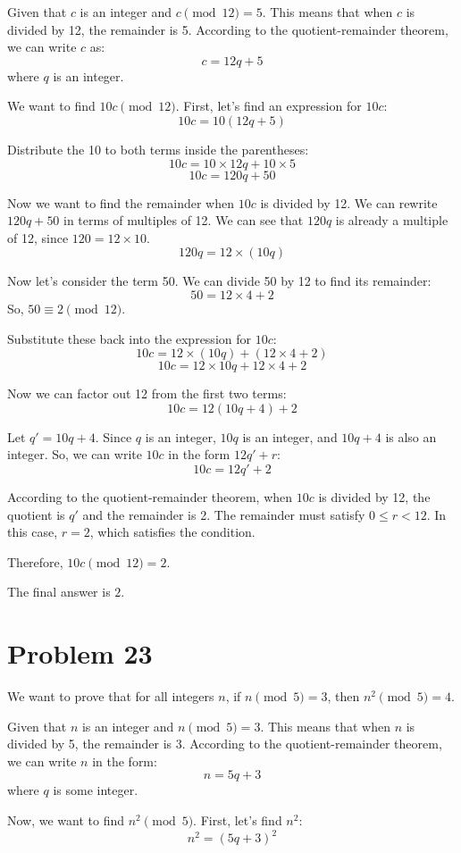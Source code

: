 \documentclass{article}
\begin{document}
Given that $c$ is an integer and $c \pmod{12} = 5$.
This means that when $c$ is divided by 12, the remainder is 5.
According to the quotient-remainder theorem, we can write $c$ as:
$$ c = 12q + 5 $$
where $q$ is an integer.

We want to find $10c \pmod{12}$.
First, let's find an expression for $10c$:
$$ 10c = 10(12q + 5) $$

Distribute the 10 to both terms inside the parentheses:
$$ 10c = 10 \times 12q + 10 \times 5 $$
$$ 10c = 120q + 50 $$

Now we want to find the remainder when $10c$ is divided by 12. We can rewrite $120q + 50$ in terms of multiples of 12.
We can see that $120q$ is already a multiple of 12, since $120 = 12 \times 10$.
$$ 120q = 12 \times (10q) $$

Now let's consider the term 50. We can divide 50 by 12 to find its remainder:
$$ 50 = 12 \times 4 + 2 $$
So, $50 \equiv 2 \pmod{12}$.

Substitute these back into the expression for $10c$:
$$ 10c = 12 \times (10q) + (12 \times 4 + 2) $$
$$ 10c = 12 \times 10q + 12 \times 4 + 2 $$

Now we can factor out 12 from the first two terms:
$$ 10c = 12(10q + 4) + 2 $$

Let $q' = 10q + 4$. Since $q$ is an integer, $10q$ is an integer, and $10q + 4$ is also an integer.
So, we can write $10c$ in the form $12q' + r$:
$$ 10c = 12q' + 2 $$

According to the quotient-remainder theorem, when $10c$ is divided by 12, the quotient is $q'$ and the remainder is 2. The remainder must satisfy $0 \le r < 12$. In this case, $r=2$, which satisfies the condition.

Therefore, $10c \pmod{12} = 2$.

The final answer is $\boxed{2}$.

\newpage

\section*{Problem 23}
We want to prove that for all integers $n$, if $n \pmod{5} = 3$, then $n^2 \pmod{5} = 4$.

Given that $n$ is an integer and $n \pmod{5} = 3$.
This means that when $n$ is divided by 5, the remainder is 3.
According to the quotient-remainder theorem, we can write $n$ in the form:
$$n = 5q + 3$$
where $q$ is some integer.

Now, we want to find $n^2 \pmod{5}$.
First, let's find $n^2$:
$$n^2 = (5q + 3)^2$$
\end{document}
